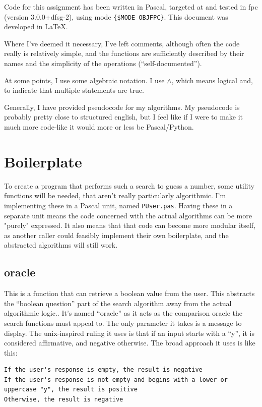 \documentclass{article}
\begin{document}
    Code for this assignment has been written in Pascal, targeted at and tested
    in fpc (version 3.0.0+dfsg-2), using mode \verb|{$MODE OBJFPC}|. This
    document was developed in \LaTeX.

    Where I've deemed it necessary, I've left comments, although often the code
    really is relatively simple, and the functions are sufficiently described
    by their names and the simplicity of the operations (``self-documented'').

    At some points, I use some algebraic notation. I use $\wedge$, which means
    logical and, to indicate that multiple statements are true.

    Generally, I have provided pseudocode for my algorithms. My pseudocode is
    probably pretty close to structured english, but I feel like if I were to
    make it much more code-like it would more or less be Pascal/Python.

    \section{Boilerplate}
    To create a program that performs such a search to guess a number, some
    utility functions will be needed, that aren't really particularly
    algorithmic. I'm implementing these in a Pascal unit, named
    \verb|PUser.pas|. Having these in a separate unit means the code concerned
    with the actual algorithms can be more "purely" expressed. It also means
    that that code can become more modular itself, as another caller could
    feasibly implement their own boilerplate, and the abstracted algorithms
    will still work.

    \subsection{oracle}
    This is a function that can retrieve a boolean value from the user. This
    abstracts the ``boolean question'' part of the search algorithm away from
    the actual algorithmic logic.. It's named ``oracle'' as it acts as the
    comparison oracle the search functions must appeal to. The only parameter
    it takes is a message to display. The unix-inspired ruling it uses is that
    if an input starts with a ``y'', it is considered affirmative, and negative
    otherwise. The broad approach it uses is like this:

\begin{lstlisting}[caption=oracle pseudocode]
If the user's response is empty, the result is negative
If the user's response is not empty and begins with a lower or uppercase "y", the result is positive
Otherwise, the result is negative
\end{lstlisting}
\end{document}
